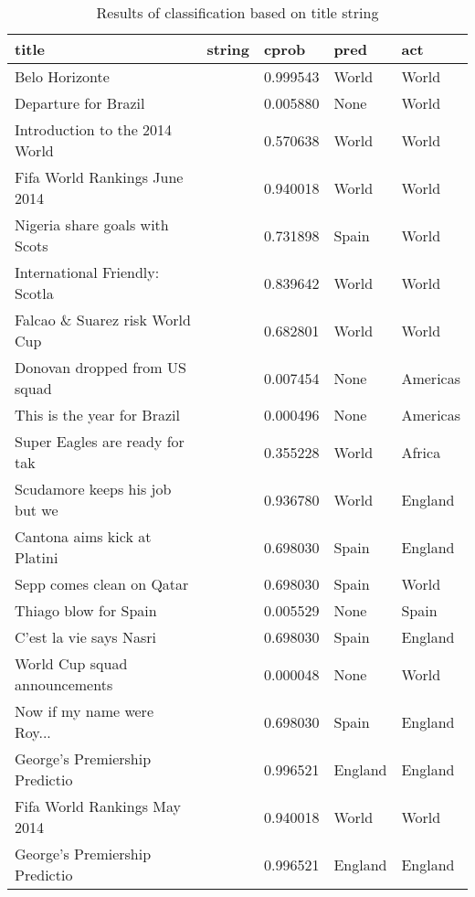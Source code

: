 \begin{table}[h]
\centering
\caption{Results of classification based on title string}
\begin{tabular}{l|l|l|l|l}
title                           & string & cprob    & pred    & act      \\ \hline \hline
Belo Horizonte                  &        & 0.999543 & World   & World    \\
Departure for Brazil            &        & 0.005880 & None    & World    \\
Introduction to the 2014 World  &        & 0.570638 & World   & World    \\
Fifa World Rankings June 2014   &        & 0.940018 & World   & World    \\
Nigeria share goals with Scots  &        & 0.731898 & Spain   & World    \\
International Friendly: Scotla  &        & 0.839642 & World   & World    \\
Falcao \& Suarez risk World Cup &        & 0.682801 & World   & World    \\
Donovan dropped from US squad   &        & 0.007454 & None    & Americas \\
This is the year for Brazil     &        & 0.000496 & None    & Americas \\
Super Eagles are ready for tak  &        & 0.355228 & World   & Africa   \\
Scudamore keeps his job but we  &        & 0.936780 & World   & England  \\
Cantona aims kick at Platini    &        & 0.698030 & Spain   & England  \\
Sepp comes clean on Qatar       &        & 0.698030 & Spain   & World    \\
Thiago blow for Spain           &        & 0.005529 & None    & Spain    \\
C'est la vie says Nasri         &        & 0.698030 & Spain   & England  \\
World Cup squad announcements   &        & 0.000048 & None    & World    \\
Now if my name were Roy...      &        & 0.698030 & Spain   & England  \\
George's Premiership Predictio  &        & 0.996521 & England & England  \\
Fifa World Rankings May 2014    &        & 0.940018 & World   & World    \\
George's Premiership Predictio  &        & 0.996521 & England & England  \\

\end{tabular}
\end{table}
